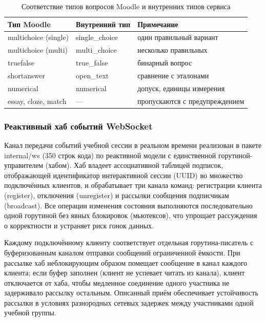 \begin{table}[!htb]
\fontsize{11pt}{13pt}\selectfont
\centering
\caption{Соответствие типов вопросов Moodle и внутренних типов сервиса}
\label{tab:import-mapping}
\smallskip
\begin{tabular}{|l|l|l|}
    \hline
    \textbf{Тип Moodle} & \textbf{Внутренний тип} & \textbf{Примечание} \\
    \hline
        multichoice (single) & single\_choice & один правильный вариант \\
    \hline
        multichoice (multi)  & multi\_choice  & несколько правильных \\
    \hline
        truefalse            & true\_false    & бинарный вопрос \\
    \hline
        shortanswer          & open\_text     & сравнение с эталонами \\
    \hline
        numerical            & numerical      & допуск, единицы измерения \\
    \hline
        essay, cloze, match & --- & пропускаются с предупреждением \\
    \hline
\end{tabular}
\end{table}
\FloatBarrier

\subsubsection{Реактивный хаб событий WebSocket}

Канал передачи событий учебной сессии в реальном времени реализован
в пакете internal/ws (350 строк кода) по реактивной модели
с единственной горутиной-управителем (хабом). Хаб владеет
ассоциативной таблицей подписок, отображающей идентификатор
интерактивной сессии (UUID) во множество подключённых клиентов,
и обрабатывает три канала команд: регистрации клиента
(register), отключения (unregister) и рассылки
сообщения подписчикам (broadcast). Все операции изменения
состояния выполняются последовательно одной горутиной без явных
блокировок (мьютексов), что упрощает рассуждения о корректности
и устраняет риск гонок данных.

Каждому подключённому клиенту соответствует отдельная горутина-писатель
с буферизованным каналом отправки сообщений ограниченной ёмкости.
При рассылке хаб неблокирующим образом помещает сообщение в канал
каждого клиента; если буфер заполнен (клиент не успевает читать
из канала), клиент отключается от хаба, чтобы медленное соединение
одного участника не задерживало рассылку остальным. Описанный
приём обеспечивает устойчивость рассылки в условиях разнородных
сетевых задержек между участниками одной учебной группы.

